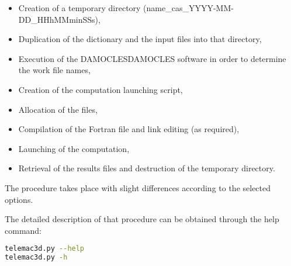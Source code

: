 \begin{itemize}
\item Creation of a temporary directory (name\_cas\_YYYY-MM-DD\_HHhMMminSSs),

\item Duplication of the dictionary and the input files into that directory,

\item Execution of the DAMOCLESDAMOCLES software in order to determine the work file names,

\item Creation of the computation launching script,

\item Allocation of the files,

\item Compilation of the Fortran file and link editing (as required),

\item Launching of the computation,

\item Retrieval of the results files and destruction of the temporary directory.
\end{itemize}

The procedure takes place with slight differences according to the selected
options.

The detailed description of that procedure can be obtained through the help
command:

\begin{lstlisting}[language=bash]
telemac3d.py --help
telemac3d.py -h
\end{lstlisting}
